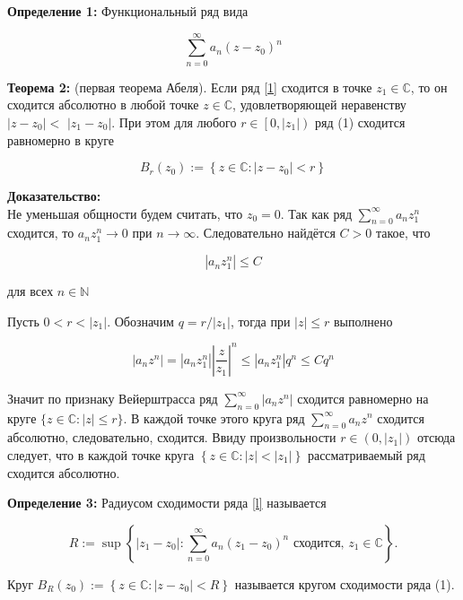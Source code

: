 \documentclass[a4paper,12pt]{article} %
\begin{document}
\textbf{Определение 1:} Функциональный ряд вида

\begin{equation}\label{1}
	\sum_{n=0}^{\infty} a_{n}\left(z-z_{0}\right)^{n}
\end{equation}


\textbf{Теорема 2:} (первая теорема Абеля). Если ряд \eqref{1} сходится в точке $z_{1} \in \mathbb{C}$, то он сходится абсолютно в любой точке $z \in \mathbb{C}$, удовлетворяющей неравенству $\left|z-z_{0}\right|<$ $\left|z_{1}-z_{0}\right|$. При этом для любого $r \in\left[0,\left|z_{1}\right|\right)$ ряд (1) сходится равномерно в круге


\begin{equation}
	B_{r}\left(z_{0}\right):=\left\{z \in \mathbb{C}:\left|z-z_{0}\right|<r\right\}
\end{equation}

\textbf{Доказательство:}\\
Не уменьшая общности будем считать, что $z_{0}=0$. Так как ряд $\sum_{n=0}^{\infty} a_{n} z_{1}^{n}$ сходится, то $a_{n} z_{1}^{n} \rightarrow 0$ при $n \rightarrow \infty$. Следовательно найдётся $C>0$ такое, что

$$
\left|a_{n} z_{1}^{n}\right| \leq C
$$

для всех $n \in \mathbb{N}$

Пусть $0<r<\left|z_{1}\right|$. Обозначим $q=r /\left|z_{1}\right|$, тогда при $|z| \leq r$ выполнено

$$
\left|a_{n} z^{n}\right|=\left|a_{n} z_{1}^{n}\right|\left|\frac{z}{z_{1}}\right|^{n} \leq\left|a_{n} z_{1}^{n}\right| q^{n} \leq C q^{n}
$$

Значит по признаку Вейерштрасса ряд $\sum_{n=0}^{\infty}\left|a_{n} z^{n}\right|$ сходится равномерно на круге $\{z \in \mathbb{C}:|z| \leq r\}$. В каждой точке этого круга ряд $\sum_{n=0}^{\infty} a_{n} z^{n}$ сходится абсолютно, следовательно, сходится. Ввиду произвольности $r \in\left(0,\left|z_{1}\right|\right)$ отсюда следует, что в каждой точке круга $\left\{z \in \mathbb{C}:|z|<\left|z_{1}\right|\right\}$ рассматриваемый ряд сходится абсолютно.

\textbf{Определение 3:} Радиусом сходимости ряда \eqref{l} называется

$$
R:=\sup \left\{\left|z_{1}-z_{0}\right|: \sum_{n=0}^{\infty} a_{n}\left(z_{1}-z_{0}\right)^{n} \text { сходится, } z_{1} \in \mathbb{C}\right\} .
$$

Круг $B_{R}\left(z_{0}\right):=\left\{z \in \mathbb{C}:\left|z-z_{0}\right|<R\right\}$ называется кругом сходимости ряда (1).
\end{document}
